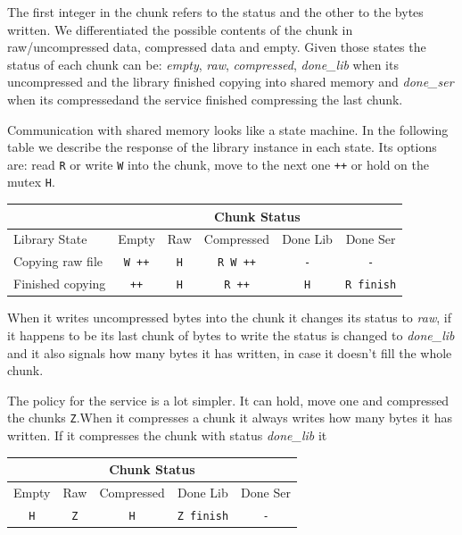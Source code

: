 \documentclass[12pt]{article}
\begin{document}
\par The first integer in the chunk refers to the status and the other to the bytes written. We differentiated the possible contents of the chunk in raw/uncompressed data, compressed data and empty. Given those states the status of each chunk can be: \textit{empty}, \textit{raw}, \textit{compressed}, \textit{done\_lib} when its uncompressed and the library finished copying into shared memory and \textit{done\_ser} when its compressedand the service finished compressing the last chunk.

\par Communication with shared memory looks like a state machine. In the following table we describe the response of the library instance in each state. Its options are: read \texttt{R} or write \texttt{W} into the chunk, move to the next one \texttt{++} or hold on the mutex \texttt{H}.

\begin{table}[h]
\centering
\begin{tabular}{|l|c|c|c|c|c|}
\hline
\multicolumn{1}{|c|}{} & \multicolumn{5}{c|}{Chunk Status} \\ \hline
Library State & Empty & Raw & Compressed & Done Lib & Done Ser\\ \hline
Copying raw file & \texttt{W ++} & \texttt{H} & \texttt{R W ++}   & \texttt{-} & \texttt{-} \\
Finished copying & \texttt{++}   & \texttt{H} & \texttt{R ++}     & \texttt{H} & \texttt{R finish} \\ \hline
\end{tabular}
\end{table}


\par When it writes uncompressed bytes into the chunk it changes its status to \textit{raw}, if it happens to be its last chunk of bytes to write the status is changed to \textit{done\_lib} and it also signals how many bytes it has written, in case it doesn't fill the whole chunk.

\par The policy for the service is a lot simpler. It can hold, move one and compressed the chunks \texttt{Z}.When it compresses a chunk it always writes how many bytes it has written. If it compresses the chunk with status \textit{done\_lib} it 


\begin{table}[h]
\centering
\begin{tabular}{|c|c|c|c|c|}
\hline
\multicolumn{5}{|c|}{Chunk Status} \\ \hline
Empty & Raw & Compressed & Done Lib & Done Ser\\ \hline
\texttt{H} & \texttt{Z} & \texttt{H} & \texttt{Z finish} & \texttt{-} \\ \hline
\end{tabular}
\end{table}
\end{document}

